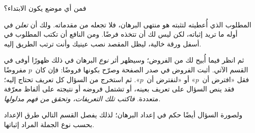 \documentclass[../../../include/open-logic-section]{subfiles}
\begin{document}


فمن أي موضع يكون الابتداء؟

المطلوب الذي أُعطيته لتثبته هو منتهى البرهان، فلا تجعله من مقدماته.
ولك أن \emph{تعلن} في أوله ما تريد إثباته، لكن ليس لك أن تتخذه
فرضًا. ومن النافع أن تكتب المطلوب في أسفل ورقة خالية، ليظل المقصد
نصب عينيك وأنت ترتب الطريق إليه.

ثم انظر فيما أُبيح لك من الفروض؛ وسيظهر أثر \emph{نوع} البرهان في
ذلك ظهورًا أوفى في القسم الآتي. أثبت الفروض في صدر الصفحة وصرّح
بكونها فروضًا: فإن كان~$p$ مفروضًا فقل «افترض أن~$p$» أو «لنفترض
أن~$p$». ثم استخرج من السؤال كل تعريف تحتاج إليه؛ فقد ينص السؤال على
تعريف بعينه، أو تشتمل فروضه أو نتيجته على ألفاظ معرّفة متعددة.
\emph{فاكتب تلك التعريفات، وتحقق من فهم مدلولها.}

ولصورة السؤال أيضًا حكم في إعداد البرهان؛ لذلك يفصل القسم التالي طرق
الإعداد بحسب نوع الجملة المراد إثباتها.
\end{document}
